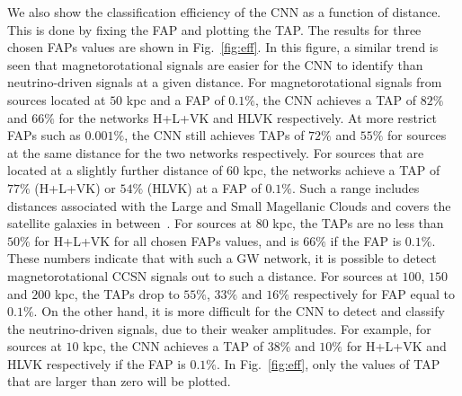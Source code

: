 \documentclass[aps,twocolumn,showpacs,groupedaddress, nofootinbib]{revtex4}  %
\begin{document}
%
%
We also show the classification efficiency of the \ac{CNN}  as a function of
distance.  This is done by fixing the \ac{FAP} and plotting the \ac{TAP}.  The
results for three chosen \acp{FAP} values are shown in Fig.~\ref{fig:eff}.  In
this figure, a similar trend is seen that magnetorotational signals are easier
for the \ac{CNN} to identify than neutrino-driven signals at a given distance.
For magnetorotational signals from sources located at $50$ kpc and a \ac{FAP}
of $0.1\%$, the \ac{CNN} achieves a \ac{TAP} of $82\%$ and $66\%$ for the
networks H+L+VK and HLVK respectively. At more restrict \acp{FAP} such as
$0.001\%$, the \ac{CNN} still achieves \acp{TAP} of $72\%$ and $55\%$ for sources at
the same distance for the two networks respectively.  For sources that are
located at a slightly further distance of $60$ kpc, the networks achieve a
\ac{TAP} of $77\%$ (H+L+VK) or $54\%$ (HLVK) at a \ac{FAP} of $0.1\%$. Such a range
includes distances associated with the Large and Small Magellanic Clouds and
covers the satellite galaxies in between~\cite{karachentsev2004catalog,
belokurov2007cats}.  For sources at $80$ kpc, the \acp{TAP} are no less than $50\%$ 
for H+L+VK for all chosen \acp{FAP} values, and is $66\%$ if
the \ac{FAP} is $0.1\%$. These numbers indicate that with
such a \ac{GW} network, it is possible to detect magnetorotational \ac{CCSN}
signals out to such a distance. For sources at $100$, $150$ and $200$ kpc, the \acp{TAP}
drop to $55\%$, $33\%$ and $16\%$ respectively for \ac{FAP} equal to $0.1\%$.
On the other hand, it is more difficult for the
\ac{CNN} to detect and classify the neutrino-driven signals, due to their
weaker amplitudes. For example, for sources at $10$ kpc, the \ac{CNN} achieves
a \ac{TAP} of $38\%$ and $10\%$ for H+L+VK and HLVK respectively if the
\ac{FAP} is $0.1\%$. In Fig.~\ref{fig:eff}, only the values of \ac{TAP} that
are larger than zero will be plotted.
\end{document}
